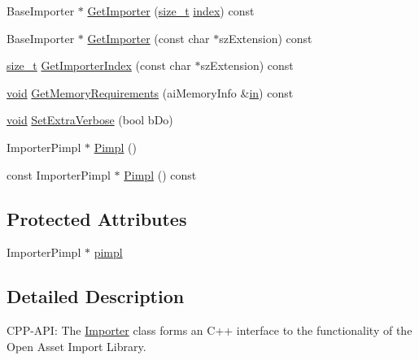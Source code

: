 \begin{DoxyCompactItemize}
\item 
Base\-Importer $\ast$ \hyperlink{class_assimp_1_1_importer_a712a0545a11c9d198392867552ba6646}{Get\-Importer} (\hyperlink{_s_d_l__config_8h_a7c94ea6f8948649f8d181ae55911eeaf}{size\-\_\-t} \hyperlink{_g_l_e_w_2glew_8h_a57f14e05b1900f16a2da82ade47d0c6d}{index}) const 
\item 
Base\-Importer $\ast$ \hyperlink{class_assimp_1_1_importer_a18921ab411273fa95961f60848ad6007}{Get\-Importer} (const char $\ast$sz\-Extension) const 
\item 
\hyperlink{_s_d_l__config_8h_a7c94ea6f8948649f8d181ae55911eeaf}{size\-\_\-t} \hyperlink{class_assimp_1_1_importer_aee103460f66b9cbe3143400ec92ffc56}{Get\-Importer\-Index} (const char $\ast$sz\-Extension) const 
\item 
\hyperlink{_s_d_l__opengl_8h_a3db05964a3cc4410f35b7ea2b7eb850d}{void} \hyperlink{class_assimp_1_1_importer_aba2eacd0b627cb481b6d66d9ca55eac9}{Get\-Memory\-Requirements} (ai\-Memory\-Info \&\hyperlink{_g_l_e_w_2glew_8h_a83ad0ee7f1e06b59c90271716e689080}{in}) const 
\item 
\hyperlink{_s_d_l__opengl_8h_a3db05964a3cc4410f35b7ea2b7eb850d}{void} \hyperlink{class_assimp_1_1_importer_a9bb793072c84c784279d0f6e870bb42d}{Set\-Extra\-Verbose} (bool b\-Do)
\item 
Importer\-Pimpl $\ast$ \hyperlink{class_assimp_1_1_importer_ac112839f323a630f83395acb74746827}{Pimpl} ()
\item 
const Importer\-Pimpl $\ast$ \hyperlink{class_assimp_1_1_importer_a6bf9560ac8b1353ae809ff1d99c9c661}{Pimpl} () const 
\end{DoxyCompactItemize}
\subsection*{Protected Attributes}
\begin{DoxyCompactItemize}
\item 
Importer\-Pimpl $\ast$ \hyperlink{class_assimp_1_1_importer_a3928bb8d375fd676dd5dbe33382e46ce}{pimpl}
\end{DoxyCompactItemize}


\subsection{Detailed Description}
C\-P\-P-\/\-A\-P\-I\-: The \hyperlink{class_assimp_1_1_importer}{Importer} class forms an C++ interface to the functionality of the Open Asset Import Library.

